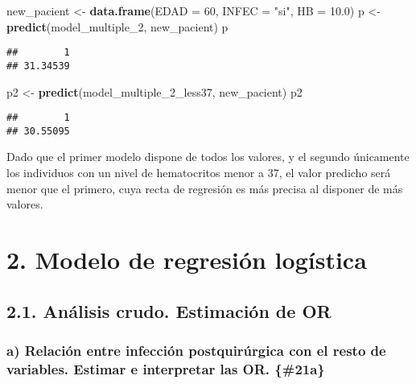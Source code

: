 \documentclass[]{article}
\newenvironment{Shaded}{\begin{snugshade}}{\end{snugshade}}
\newcommand{\DataTypeTok}[1]{\textcolor[rgb]{0.13,0.29,0.53}{#1}}
\newcommand{\DecValTok}[1]{\textcolor[rgb]{0.00,0.00,0.81}{#1}}
\newcommand{\FloatTok}[1]{\textcolor[rgb]{0.00,0.00,0.81}{#1}}
\newcommand{\KeywordTok}[1]{\textcolor[rgb]{0.13,0.29,0.53}{\textbf{#1}}}
\newcommand{\NormalTok}[1]{#1}
\newcommand{\StringTok}[1]{\textcolor[rgb]{0.31,0.60,0.02}{#1}}
\begin{document}
\begin{Shaded}
\begin{Highlighting}[]
\NormalTok{new_pacient <-}\StringTok{ }\KeywordTok{data.frame}\NormalTok{(}\DataTypeTok{EDAD =} \DecValTok{60}\NormalTok{, }\DataTypeTok{INFEC =} \StringTok{"si"}\NormalTok{, }\DataTypeTok{HB =} \FloatTok{10.0}\NormalTok{)}
\NormalTok{p <-}\StringTok{ }\KeywordTok{predict}\NormalTok{(model_multiple_}\DecValTok{2}\NormalTok{, new_pacient)}
\NormalTok{p}
\end{Highlighting}
\end{Shaded}

\begin{verbatim}
##        1 
## 31.34539
\end{verbatim}

\begin{Shaded}
\begin{Highlighting}[]
\NormalTok{p2 <-}\StringTok{ }\KeywordTok{predict}\NormalTok{(model_multiple_}\DecValTok{2}\NormalTok{_less37, new_pacient)}
\NormalTok{p2}
\end{Highlighting}
\end{Shaded}

\begin{verbatim}
##        1 
## 30.55095
\end{verbatim}

Dado que el primer modelo dispone de todos los valores, y el segundo
únicamente los individuos con un nivel de hematocritos menor a 37, el
valor predicho será menor que el primero, cuya recta de regresión es más
precisa al disponer de más valores.

\hypertarget{modelo-de-regresiuxf3n-loguxedstica}{%
\section{2. Modelo de regresión
logística}\label{modelo-de-regresiuxf3n-loguxedstica}}

\hypertarget{anuxe1lisis-crudo.-estimaciuxf3n-de-or}{%
\subsection{2.1. Análisis crudo. Estimación de
OR}\label{anuxe1lisis-crudo.-estimaciuxf3n-de-or}}

\hypertarget{a-relaciuxf3n-entre-infecciuxf3n-postquiruxfargica-con-el-resto-de-variables.-estimar-e-interpretar-las-or.-21a}{%
\subsubsection{a) Relación entre infección postquirúrgica con el resto
de variables. Estimar e interpretar las OR.
\{\#21a\}}\label{a-relaciuxf3n-entre-infecciuxf3n-postquiruxfargica-con-el-resto-de-variables.-estimar-e-interpretar-las-or.-21a}}
\end{document}
